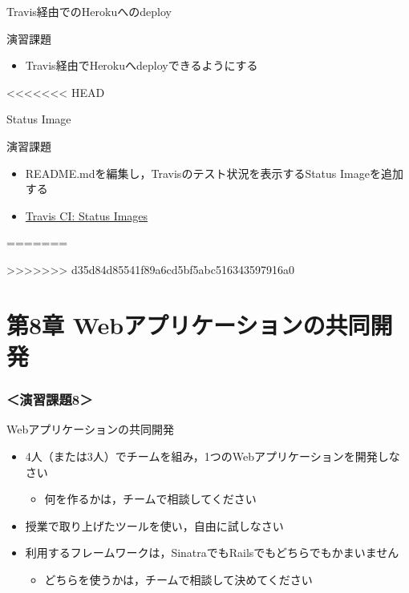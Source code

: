 \documentclass[t, aspectratio=169]{beamer}
\begin{document}
\begin{frame}[label=sec-7-4-4]{Travis経由でのHerokuへのdeploy}
\begin{block}{演習課題}
\begin{itemize}
\item Travis経由でHerokuへdeployできるようにする
\end{itemize}
\end{block}
\end{frame}
<<<<<<< HEAD
\begin{frame}[label=sec-7-4-5]{Status Image}
\begin{block}{演習課題}
\begin{itemize}
\item README.mdを編集し，Travisのテスト状況を表示するStatus Imageを追加する
\item \href{http://docs.travis-ci.com/user/status-images/}{Travis CI: Status Images}
\end{itemize}
\end{block}
\end{frame}
=======

>>>>>>> d35d84d85541f89a6cd5bf5abc516343597916a0
\part{第8章 Webアプリケーションの共同開発}
\label{sec-8}
\section{＜演習課題8＞}
\label{sec-8-1}
\begin{frame}[label=sec-8-1-1]{Webアプリケーションの共同開発}
\begin{itemize}
\item 4人（または3人）でチームを組み，1つのWebアプリケーションを開発しなさい
\begin{itemize}
\item 何を作るかは，チームで相談してください
\end{itemize}
\item 授業で取り上げたツールを使い，自由に試しなさい
\item 利用するフレームワークは，SinatraでもRailsでもどちらでもかまいません
\begin{itemize}
\item どちらを使うかは，チームで相談して決めてください
\end{itemize}
\end{itemize}
\end{frame}
\end{document}
